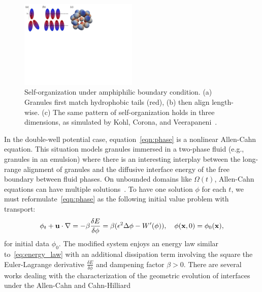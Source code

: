 \begin{figure}
  \vspace{-8pt}
  \centerline{\includegraphics[width=0.5\textwidth]{figures/SA1Figures/AmphiphilicAssembly.pdf}}
  \vspace{-8pt}
  \caption{\label{fig:amphiphilic_assembly} \footnotesize
  Self-organization under amphiphilic boundary condition. (a) Granules
  first match hydrophobic tails (red), (b) then align length-wise. (c)
  The same pattern of self-organization holds in three dimensions, as
  simulated by Kohl, Corona, and
  Veerapaneni~\cite{koh-cor-che-vee2021}.}
\end{figure}
In the double-well potential case, equation~\eqref{eqn:phase} is a
nonlinear Allen-Cahn equation. This situation models granules immersed
in a two-phase fluid (e.g., granules in an emulsion) where there is an
interesting interplay between the long-range alignment of granules and
the diffusive interface energy of the free boundary between fluid
phases. On unbounded domains like $\Omega(t)$, Allen-Cahn equations can
have multiple solutions~\cite{Alama1997StationaryLS,
Alikakos2008OnAE, Bronsard1993OnTB, Byeon2014SolutionsOH, Byeon2013OnAP,
Alessio2005ENTIRESI, Trumper2007ExistenceOA, Benci2019MultipleSF}.
To have one solution $\phi$ for each $t$, 
we must reformulate~\eqref{eqn:phase} as
the following initial value problem with transport:
\begin{align}
  \label{eqn:phase_transport}
  \phi_t + \mathbf{u} \cdot \nabla
  = -\beta \frac{\delta E}{\delta \phi}
  = \beta(\epsilon^2 \Delta \phi - W'(\phi)),
  \quad \phi(\mathbf{x},0) = \phi_0(\mathbf{x}),
\end{align}
for initial data $\phi_0$. The modified system enjoys an energy law
similar to~\eqref{eq:energy_law} with an additional dissipation term
involving the square the Euler-Lagrange derivative $\frac{\delta
E}{\delta \phi}$ and dampening factor $\beta > 0$. There are several
works dealing with the characterization of the geometric evolution of
interfaces under the Allen-Cahn and Cahn-Hilliard
